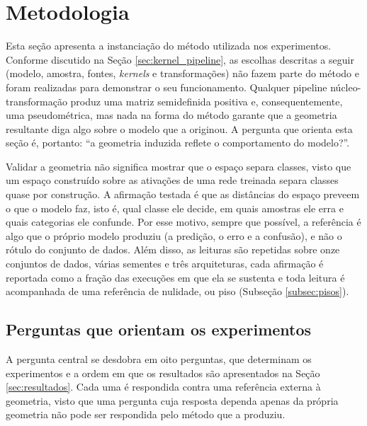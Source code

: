 \section{Metodologia}\label{sec:metodologia}

Esta seção apresenta a instanciação do método utilizada nos experimentos. Conforme discutido na Seção \ref{sec:kernel_pipeline}, as escolhas descritas a seguir (modelo, amostra, fontes, \textit{kernels} e transformações) não fazem parte do método e foram realizadas para demonstrar o seu funcionamento. Qualquer pipeline núcleo-transformação produz uma matriz semidefinida positiva e, consequentemente, uma pseudométrica, mas nada na forma do método garante que a geometria resultante diga algo sobre o modelo que a originou. A pergunta que orienta esta seção é, portanto: ``a geometria induzida reflete o comportamento do modelo?''.

Validar a geometria não significa mostrar que o espaço separa classes, visto que um espaço construído sobre as ativações de uma rede treinada separa classes quase por construção. A afirmação testada é que as distâncias do espaço preveem o que o modelo faz, isto é, qual classe ele decide, em quais amostras ele erra e quais categorias ele confunde. Por esse motivo, sempre que possível, a referência é algo que o próprio modelo produziu (a predição, o erro e a confusão), e não o rótulo do conjunto de dados. Além disso, as leituras são repetidas sobre onze conjuntos de dados, várias sementes e três arquiteturas, cada afirmação é reportada como a fração das execuções em que ela se sustenta e toda leitura é acompanhada de uma referência de nulidade, ou piso (Subseção \ref{subsec:pisos}).

\subsection{Perguntas que orientam os experimentos}\label{subsec:perguntas}

A pergunta central se desdobra em oito perguntas, que determinam os experimentos e a ordem em que os resultados são apresentados na Seção \ref{sec:resultados}. Cada uma é respondida contra uma referência externa à geometria, visto que uma pergunta cuja resposta dependa apenas da própria geometria não pode ser respondida pelo método que a produziu.


